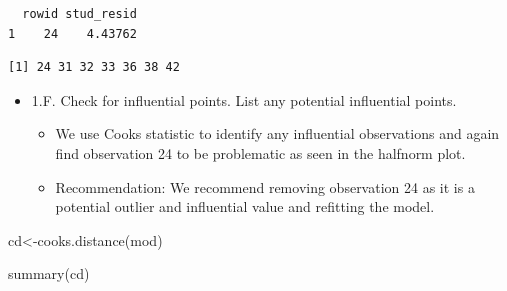 \documentclass[
  letterpaper,
  DIV=11,
  numbers=noendperiod]{scrartcl}
\newenvironment{Shaded}{\begin{snugshade}}{\end{snugshade}}
\newcommand{\FunctionTok}[1]{\textcolor[rgb]{0.28,0.35,0.67}{#1}}
\newcommand{\NormalTok}[1]{\textcolor[rgb]{0.00,0.23,0.31}{#1}}
\newcommand{\OtherTok}[1]{\textcolor[rgb]{0.00,0.23,0.31}{#1}}
\newcommand{\SpecialCharTok}[1]{\textcolor[rgb]{0.37,0.37,0.37}{#1}}
\providecommand{\tightlist}{%
  \setlength{\itemsep}{0pt}\setlength{\parskip}{0pt}}\usepackage{longtable,booktabs,array}
\begin{document}
\begin{verbatim}
  rowid stud_resid
1    24    4.43762
\end{verbatim}

\begin{Shaded}
\end{Shaded}


\begin{verbatim}
[1] 24 31 32 33 36 38 42
\end{verbatim}

\begin{itemize}
\item
  1.F. Check for influential points. List any potential influential
  points.

  \begin{itemize}
  \tightlist
  \item
    We use Cooks statistic to identify any influential observations and
    again find observation 24 to be problematic as seen in the halfnorm
    plot.
  \item
    Recommendation: We recommend removing observation 24 as it is a
    potential outlier and influential value and refitting the model.
  \end{itemize}
\end{itemize}

\begin{Shaded}
\begin{Highlighting}[]
\NormalTok{cd}\OtherTok{\textless{}{-}}\FunctionTok{cooks.distance}\NormalTok{(mod)}

\FunctionTok{summary}\NormalTok{(cd)}
\end{Highlighting}
\end{Shaded}
\end{document}
